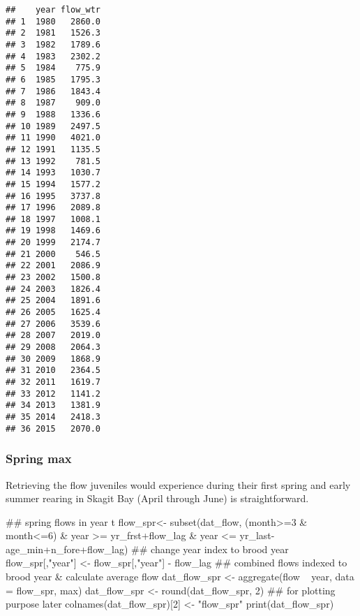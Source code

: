 \documentclass[11pt,]{article}
\newenvironment{Shaded}{}{}
\newcommand{\KeywordTok}[1]{\textcolor[rgb]{0.00,0.00,1.00}{#1}}
\newcommand{\DataTypeTok}[1]{#1}
\newcommand{\DecValTok}[1]{#1}
\newcommand{\StringTok}[1]{\textcolor[rgb]{0.00,0.50,0.50}{#1}}
\newcommand{\OperatorTok}[1]{#1}
\newcommand{\NormalTok}[1]{#1}
\begin{document}
\begin{verbatim}
##    year flow_wtr
## 1  1980   2860.0
## 2  1981   1526.3
## 3  1982   1789.6
## 4  1983   2302.2
## 5  1984    775.9
## 6  1985   1795.3
## 7  1986   1843.4
## 8  1987    909.0
## 9  1988   1336.6
## 10 1989   2497.5
## 11 1990   4021.0
## 12 1991   1135.5
## 13 1992    781.5
## 14 1993   1030.7
## 15 1994   1577.2
## 16 1995   3737.8
## 17 1996   2089.8
## 18 1997   1008.1
## 19 1998   1469.6
## 20 1999   2174.7
## 21 2000    546.5
## 22 2001   2086.9
## 23 2002   1500.8
## 24 2003   1826.4
## 25 2004   1891.6
## 26 2005   1625.4
## 27 2006   3539.6
## 28 2007   2019.0
## 29 2008   2064.3
## 30 2009   1868.9
## 31 2010   2364.5
## 32 2011   1619.7
## 33 2012   1141.2
## 34 2013   1381.9
## 35 2014   2418.3
## 36 2015   2070.0
\end{verbatim}

\subsubsection{Spring max}\label{spring-max}

Retrieving the flow juveniles would experience during their first spring
and early summer rearing in Skagit Bay (April through June) is
straightforward.

\begin{Shaded}
\begin{Highlighting}[]
\NormalTok{## spring flows in year t}
\NormalTok{flow_spr<-}\StringTok{ }\KeywordTok{subset}\NormalTok{(dat_flow, (month}\OperatorTok{>=}\DecValTok{3} \OperatorTok{&}\StringTok{ }\NormalTok{month}\OperatorTok{<=}\DecValTok{6}\NormalTok{)}
                   \OperatorTok{&}\StringTok{ }\NormalTok{year }\OperatorTok{>=}\StringTok{ }\NormalTok{yr_frst}\OperatorTok{+}\NormalTok{flow_lag}
                   \OperatorTok{&}\StringTok{ }\NormalTok{year }\OperatorTok{<=}\StringTok{ }\NormalTok{yr_last}\OperatorTok{-}\NormalTok{age_min}\OperatorTok{+}\NormalTok{n_fore}\OperatorTok{+}\NormalTok{flow_lag)}
\NormalTok{## change year index to brood year}
\NormalTok{flow_spr[,}\StringTok{"year"}\NormalTok{] <-}\StringTok{ }\NormalTok{flow_spr[,}\StringTok{"year"}\NormalTok{] }\OperatorTok{-}\StringTok{ }\NormalTok{flow_lag}
\NormalTok{## combined flows indexed to brood year & calculate average flow}
\NormalTok{dat_flow_spr <-}\StringTok{ }\KeywordTok{aggregate}\NormalTok{(flow }\OperatorTok{~}\StringTok{ }\NormalTok{year, }\DataTypeTok{data =}\NormalTok{ flow_spr, max)}
\NormalTok{dat_flow_spr <-}\StringTok{ }\KeywordTok{round}\NormalTok{(dat_flow_spr, }\DecValTok{2}\NormalTok{)}
\NormalTok{## for plotting purpose later}
\KeywordTok{colnames}\NormalTok{(dat_flow_spr)[}\DecValTok{2}\NormalTok{] <-}\StringTok{ "flow_spr"}
\KeywordTok{print}\NormalTok{(dat_flow_spr)}
\end{Highlighting}
\end{Shaded}
\end{document}
